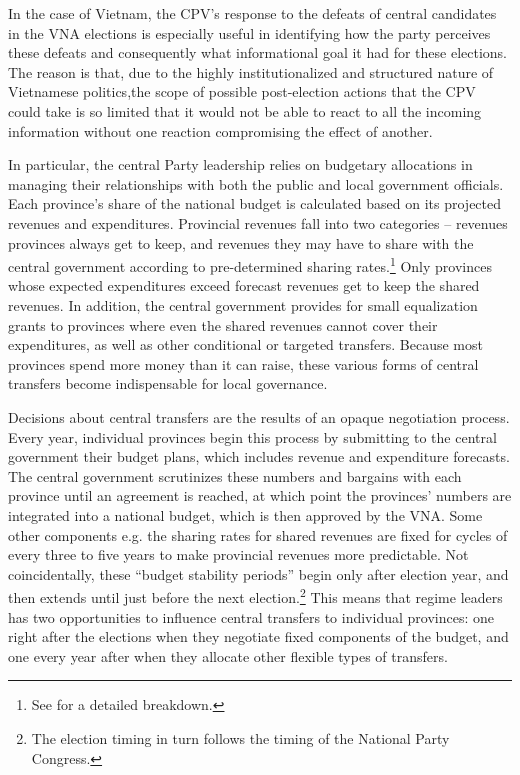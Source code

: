 \documentclass[12pt]{article}
\newcommand\fnote[1]{\footnote{\baselineskip=2\normalbaselineskip#1}}
\newcommand{\1}{\mathbbm{1}}
\begin{document}
In the case of Vietnam, the CPV's response to the defeats of central candidates in the VNA elections is especially useful in identifying how the party perceives these defeats and consequently what informational goal it had for these elections. The reason is that, due to the highly institutionalized and structured nature of Vietnamese politics,the scope of possible post-election actions that the CPV could take is so limited that it would not be able to react to all the incoming information without one reaction compromising the effect of another.

In particular, the central Party leadership relies on budgetary allocations in managing their relationships with both the public and local government officials. Each province's share of the national budget is calculated based on its projected revenues and expenditures. Provincial revenues fall into two categories -- revenues provinces always get to keep, and revenues they may have to share with the central government according to pre-determined sharing rates.\fnote{See \citet{MartinezVazquez2004} for a detailed breakdown.} Only provinces whose expected expenditures exceed forecast revenues get to keep the shared revenues. In addition, the central government provides for small equalization grants to provinces where even the shared revenues cannot cover their expenditures, as well as other conditional or targeted transfers. Because most provinces spend more money than it can raise, these various forms of central transfers become indispensable for local governance.

Decisions about central transfers are the results of an opaque negotiation process. Every year, individual provinces begin this process by submitting to the central government their budget plans, which includes revenue and expenditure forecasts. The central government scrutinizes these numbers and bargains with each province until an agreement is reached, at which point the provinces' numbers are integrated into a national budget, which is then approved by the VNA. Some other components e.g. the sharing rates for shared revenues are fixed for cycles of every three to five years to make provincial revenues more predictable. Not coincidentally, these ``budget stability periods'' begin only after election year, and then extends until just before the next election.\fnote{The election timing in turn follows the timing of the National Party Congress.} This means that regime leaders has two opportunities to influence central transfers to individual provinces: one right after the elections when they negotiate fixed components of the budget, and one every year after when they allocate other flexible types of transfers.
\end{document}
